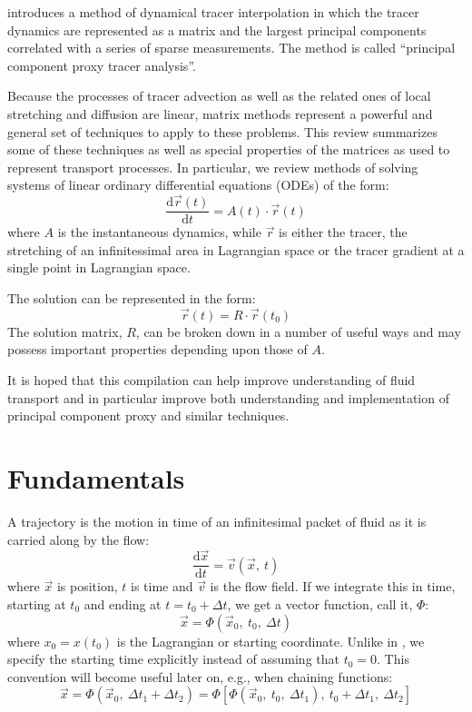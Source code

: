 \documentclass[11pt]{article}
\begin{document}
\citet{Mills2012} introduces a method of dynamical tracer interpolation
in which the tracer dynamics are represented as a matrix and the largest
principal components correlated with a series of sparse measurements.
The method is called ``principal component proxy tracer analysis''.

Because the processes of tracer advection as well as the related ones
of local stretching and diffusion are linear, 
matrix methods represent a powerful and
general set of techniques to apply to these problems.
This review summarizes some of these techniques as well as special properties
of the matrices as used to represent transport processes.  In particular, 
we review methods of solving systems of linear ordinary differential
equations (ODEs) of the form:
\begin{equation}
\frac{\mathrm d \vec r(t)}{\mathrm d t} = A(t) \cdot \vec r(t)
\end{equation}
where $A$ is the instantaneous dynamics, while $\vec r$ is either the tracer,
the stretching of an infinitessimal area in Lagrangian space or the tracer gradient at a single point
in Lagrangian space. 

The solution can be represented in the form:
\begin{equation}
\vec r(t)=R \cdot \vec r(t_0)
\end{equation}
The solution matrix, $R$, can be broken down in a number of useful ways
and may possess important properties depending upon those of $A$.  

It is hoped that this compilation
can help improve understanding of fluid transport and in particular 
improve both understanding and implementation of principal component
proxy and similar techniques.

\section{Fundamentals}

A trajectory is the motion in time of an infinitesimal packet of fluid
as it is carried along by the flow:
\begin{equation}
	\frac{\mathrm d \vec x}{\mathrm d t}=\vec v(\vec x,~t) \label{trajectory_equation}
\end{equation}
where $\vec x$ is position, $t$ is time and $\vec v$ is the flow field.
If we integrate this in time, starting at $t_0$ and ending at $t=t_0+\Delta t$, we get a
vector function, call it, $\Phi$:
\begin{equation}
	\vec x=\Phi(\vec x_0,~t_0,~\Delta t)
\label{traj_def}
\end{equation}
where $x_0=x(t_0)$ is the Lagrangian or starting coordinate.
Unlike in \citet{Ottino1989}, we specify the starting time explicitly instead 
of assuming that $t_0=0$.  This convention will become useful later on, e.g., 
when chaining functions:
\begin{equation}
\vec x=\Phi(\vec x_0,~\Delta t_1+\Delta t_2)=\Phi[\Phi(\vec x_0,~t_0,~\Delta t_1),~t_0 + \Delta t_1,~\Delta t_2]
\label{traj_fun_chaining}
\end{equation}
\end{document}
